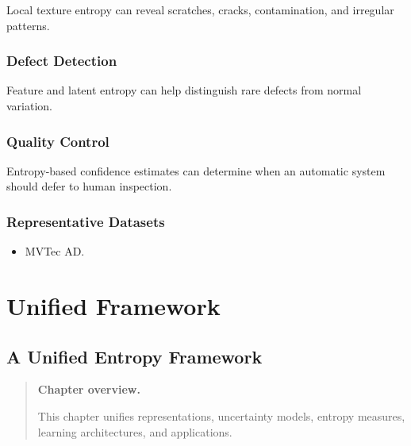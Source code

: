 \documentclass[11pt,oneside]{book}
\theoremstyle{remark}
\newenvironment{chapteroverview}
{
	\begin{quote}
		\small
		\textbf{Chapter overview.}
	}
	{
	\end{quote}
}
\newenvironment{datasetlist}
{
	\begin{itemize}[label=\(\triangleright\)]
	}
	{
	\end{itemize}
}
\begin{document}
	Local texture entropy can reveal scratches, cracks, contamination, and
	irregular patterns.
	
	\section{Defect Detection}
	
	Feature and latent entropy can help distinguish rare defects from normal
	variation.
	
	\section{Quality Control}
	
	Entropy-based confidence estimates can determine when an automatic system
	should defer to human inspection.
	
	\section*{Representative Datasets}
	
	\begin{datasetlist}
		\item MVTec AD.
	\end{datasetlist}
	
	
	\part{Unified Framework}
	
	
	\chapter{A Unified Entropy Framework}
	\label{chap:unified-framework}
	
	\begin{chapteroverview}
		This chapter unifies representations, uncertainty models, entropy measures,
		learning architectures, and applications.
	\end{chapteroverview}
	
\end{document}
